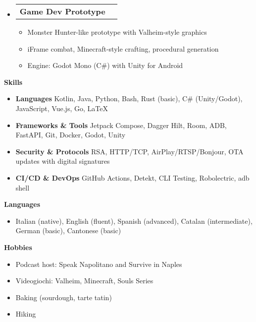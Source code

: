 \documentclass[letterpaper,12pt]{article}[leftmargin=*]
\makeatletter
\def \entryspacing {-0pt}
\renewcommand{\section}[2]{\vspace{5pt}
  \colorbox{secondary}{\color{white}\raggedbottom\normalsize\textbf{{#1}{\hspace{7pt}#2}}}
}
\newcommand{\resumeEntryStart}{\begin{itemize}[leftmargin=2.5mm]}
\newcommand{\resumeEntryEnd}{\end{itemize}\vspace{\entryspacing}}
\newcommand{\resumeItemListStart}{\begin{itemize}[leftmargin=*,itemsep=0pt]}
\newcommand{\resumeItemListEnd}{\end{itemize}}
\newcommand{\resumeItem}[1]{
  \item\small{
    {#1 \vspace{-2pt}}
  }
}
\newcommand{\resumeEntryTD}[2]{
  \vspace{-1pt}\item[]
    \begin{tabularx}{0.97\textwidth}{X@{\hspace{60pt}}r}
      \textbf{\color{primary}#1} & {\firabook\color{accent}\small#2} \\
    \end{tabularx}\vspace{-6pt}
}
\newcommand{\resumeEntryS}[2]{
  \item[]\small{
    \textbf{\color{primary}#1 }{ #2 \vspace{-6pt}}
  }
}
\makeatother
\begin{document}
  \resumeEntryStart
    \resumeEntryTD
      {Game Dev Prototype}{}
    \resumeItemListStart
        \resumeItem{Monster Hunter-like prototype with Valheim-style graphics}
        \resumeItem{iFrame combat, Minecraft-style crafting, procedural generation}
        \resumeItem{Engine: Godot Mono (C\#) with Unity for Android}
    \resumeItemListEnd
  \resumeEntryEnd

\section{}{Skills}
 \resumeEntryStart
   \resumeEntryS{Languages}{Kotlin, Java, Python, Bash, Rust (basic), C\# (Unity/Godot), JavaScript, Vue.js, Go, LaTeX}
   \resumeEntryS{Frameworks \& Tools}{Jetpack Compose, Dagger Hilt, Room, ADB, FastAPI, Git, Docker, Godot, Unity}
   \resumeEntryS{Security \& Protocols}{RSA, HTTP/TCP, AirPlay/RTSP/Bonjour, OTA updates with digital signatures}
   \resumeEntryS{CI/CD \& DevOps}{GitHub Actions, Detekt, CLI Testing, Robolectric, adb shell}
 \resumeEntryEnd

\section{}{Languages}
  \resumeEntryStart
    \resumeEntryS{}{Italian (native), English (fluent), Spanish (advanced), Catalan (intermediate), German (basic), Cantonese (basic)}
  \resumeEntryEnd

\section{}{Hobbies}
  \resumeEntryStart
    \resumeEntryS{}{Podcast host: Speak Napolitano and Survive in Naples}
    \resumeEntryS{}{Videogiochi: Valheim, Minecraft, Souls Series}
    \resumeEntryS{}{Baking (sourdough, tarte tatin)}
    \resumeEntryS{}{Hiking}
  \resumeEntryEnd
\end{document}
